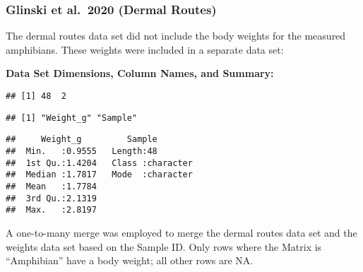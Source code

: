 \documentclass[
]{article}
\newenvironment{Shaded}{\begin{snugshade}}{\end{snugshade}}
\newcommand{\CommentTok}[1]{\textcolor[rgb]{0.56,0.35,0.01}{\textit{#1}}}
\newcommand{\DataTypeTok}[1]{\textcolor[rgb]{0.13,0.29,0.53}{#1}}
\newcommand{\DecValTok}[1]{\textcolor[rgb]{0.00,0.00,0.81}{#1}}
\newcommand{\KeywordTok}[1]{\textcolor[rgb]{0.13,0.29,0.53}{\textbf{#1}}}
\newcommand{\NormalTok}[1]{#1}
\newcommand{\OperatorTok}[1]{\textcolor[rgb]{0.81,0.36,0.00}{\textbf{#1}}}
\newcommand{\OtherTok}[1]{\textcolor[rgb]{0.56,0.35,0.01}{#1}}
\newcommand{\StringTok}[1]{\textcolor[rgb]{0.31,0.60,0.02}{#1}}
\begin{document}
\hypertarget{glinski-et-al.-2020-dermal-routes-1}{%
\subsubsection{Glinski et al.~2020 (Dermal
Routes)}\label{glinski-et-al.-2020-dermal-routes-1}}

The dermal routes data set did not include the body weights for the
measured amphibians. These weights were included in a separate data set:

\textbf{Data Set Dimensions, Column Names, and Summary:}

\begin{verbatim}
## [1] 48  2
\end{verbatim}

\begin{verbatim}
## [1] "Weight_g" "Sample"
\end{verbatim}

\begin{verbatim}
##     Weight_g         Sample         
##  Min.   :0.9555   Length:48         
##  1st Qu.:1.4204   Class :character  
##  Median :1.7817   Mode  :character  
##  Mean   :1.7784                     
##  3rd Qu.:2.1319                     
##  Max.   :2.8197
\end{verbatim}

A one-to-many merge was employed to merge the dermal routes data set and
the weights data set based on the Sample ID. Only rows where the Matrix
is ``Amphibian'' have a body weight; all other rows are NA.

\begin{Shaded}
\end{Shaded}
\end{document}
